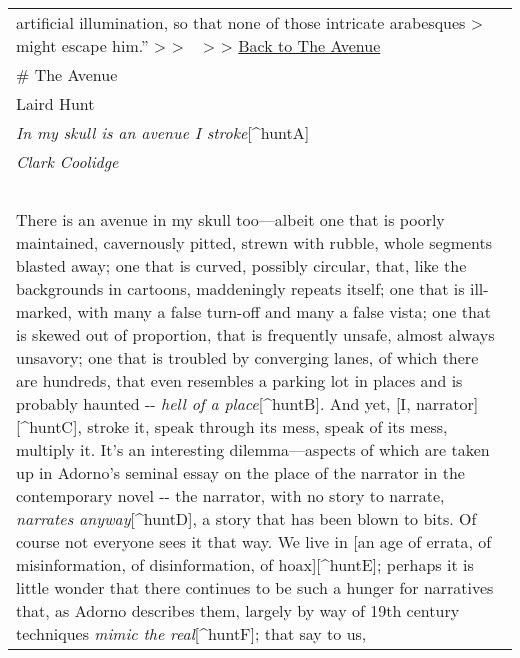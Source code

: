 \begin{longtable}[]{@{}l@{}}
\begin{minipage}[t]{0.97\columnwidth}
artificial illumination, so that none of those intricate arabesques
\textgreater{} might escape him.'' \textgreater{} \textgreater{} ~
\textgreater{} \textgreater{} \href{hunt.html}{Back to The Avenue}\strut
\end{minipage}\tabularnewline
\begin{minipage}[t]{0.97\columnwidth}\raggedright
\# The Avenue\strut
\end{minipage}\tabularnewline
\begin{minipage}[t]{0.97\columnwidth}\raggedright
Laird Hunt\strut
\end{minipage}\tabularnewline
\begin{minipage}[t]{0.97\columnwidth}\raggedright
\emph{In my skull is an avenue I stroke}{[}\^{}huntA{]}\strut
\end{minipage}\tabularnewline
\begin{minipage}[t]{0.97\columnwidth}\raggedright
\emph{Clark Coolidge}\strut
\end{minipage}\tabularnewline
\begin{minipage}[t]{0.97\columnwidth}\raggedright
~\strut
\end{minipage}\tabularnewline
\begin{minipage}[t]{0.97\columnwidth}\raggedright
There is an avenue in my skull too---albeit one that is poorly
maintained, cavernously pitted, strewn with rubble, whole segments
blasted away; one that is curved, possibly circular, that, like the
backgrounds in cartoons, maddeningly repeats itself; one that is
ill-marked, with many a false turn-off and many a false vista; one that
is skewed out of proportion, that is frequently unsafe, almost always
unsavory; one that is troubled by converging lanes, of which there are
hundreds, that even resembles a parking lot in places and is probably
haunted -\/- \emph{hell of a place}{[}\^{}huntB{]}. And yet, {[}I,
narrator{]}{[}\^{}huntC{]}, stroke it, speak through its mess, speak of
its mess, multiply it. It's an interesting dilemma---aspects of which
are taken up in Adorno's seminal essay on the place of the narrator in
the contemporary novel -\/- the narrator, with no story to narrate,
\emph{narrates anyway}{[}\^{}huntD{]}, a story that has been blown to
bits. Of course not everyone sees it that way. We live in {[}an age of
errata, of misinformation, of disinformation, of hoax{]}{[}\^{}huntE{]};
perhaps it is little wonder that there continues to be such a hunger for
narratives that, as Adorno describes them, largely by way of 19th
century techniques \emph{mimic the real}{[}\^{}huntF{]}; that say to us,

\end{minipage}
\end{longtable}
